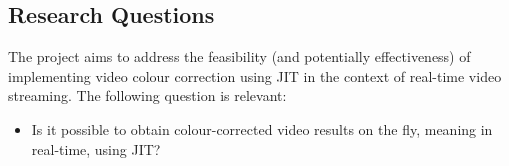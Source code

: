\documentclass[12pt,a4paper]{article}
\begin{document}















\subsection{Research Questions}

The project aims to address the feasibility (and potentially effectiveness) of implementing video colour correction using JIT in the context of real-time video streaming. The following question is relevant:

\begin{itemize}
	\item Is it possible to obtain colour-corrected video results on the fly, meaning in real-time, using JIT?
\end{itemize}
\end{document}
